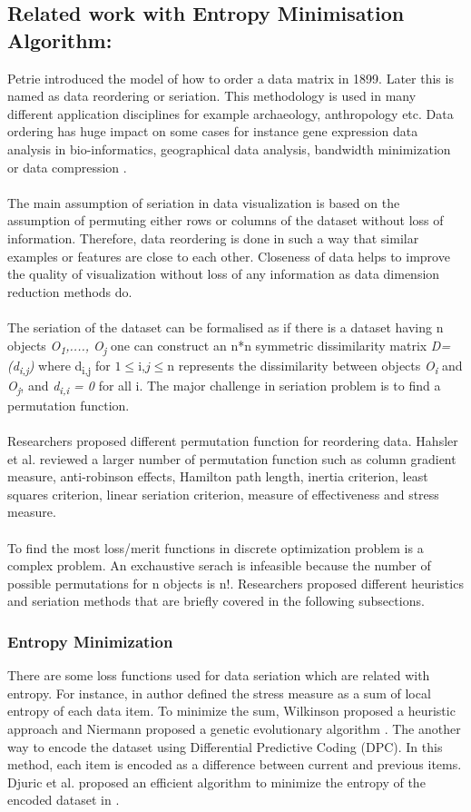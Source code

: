 \subsection{Related work with Entropy Minimisation Algorithm:}
Petrie introduced the model of how to order a data matrix in 1899. Later this is named as data reordering or seriation. This methodology is used in many different application disciplines for example archaeology, anthropology etc. Data ordering has huge impact on some cases for instance gene expression data analysis in bio-informatics, geographical data analysis, bandwidth minimization or data compression \cite{1thesis3}.\\\\
The main assumption of seriation in data visualization is based on the assumption of permuting either rows or columns of the dataset without loss of information. Therefore, data reordering is done in such a way that similar examples or features are close to each other. Closeness of data helps to improve the quality of visualization without loss of any information as data dimension reduction methods do.\\\\ 
The seriation of the dataset can be formalised as if there is a dataset having n objects \textit{O\textsubscript{1},...., O\textsubscript{j}} one can construct an n*n symmetric dissimilarity matrix \textit{D=(d\textsubscript{i,j})} where d\textsubscript{i,j} for $1 \leq $i,$j \leq $n represents the dissimilarity between objects \textit{O\textsubscript{i}} and \textit{O\textsubscript{j}}, and \textit{d\textsubscript{i,i} = 0} for all i. The major challenge in seriation problem is to find a permutation function.\\\\
Researchers proposed different permutation function for reordering data. Hahsler et al. \cite{p308} reviewed a larger number of permutation function such as column gradient measure, anti-robinson effects, Hamilton path length, inertia criterion, least squares criterion, linear seriation criterion, measure of effectiveness and stress measure.\\\\
To find the most loss/merit functions in discrete optimization problem is a complex problem. An exchaustive serach is infeasible because the number of possible permutations for n objects is n!. Researchers proposed different heuristics and seriation methods that are briefly covered in the following subsections.
\subsubsection{Entropy Minimization}
There are some loss functions used for data seriation which are related with entropy. For instance, in \cite{p309} author defined the stress measure as a sum of local entropy of each data item. To minimize the sum, Wilkinson proposed a heuristic approach \cite{p310} and Niermann proposed a genetic evolutionary algorithm \cite{p309}. The another way to encode the dataset using Differential Predictive Coding (DPC). In this method, each item is encoded as a difference between current and previous items. Djuric et al. proposed an efficient algorithm to minimize the entropy of the encoded dataset in \cite{1thesis3}.
